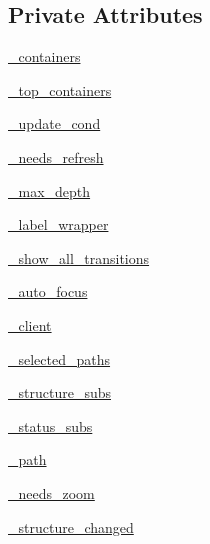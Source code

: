 \subsection*{Private Attributes}
\begin{DoxyCompactItemize}
\item 
\hyperlink{classsmacc__viewer_1_1SmaccViewerFrame_a00ea07c6cc068340230dcac273ad5e90}{\+\_\+containers}
\item 
\hyperlink{classsmacc__viewer_1_1SmaccViewerFrame_acc2f4310b3de2703026548d0d18387ea}{\+\_\+top\+\_\+containers}
\item 
\hyperlink{classsmacc__viewer_1_1SmaccViewerFrame_a87c1757aa21438ca8692b2f079b8f393}{\+\_\+update\+\_\+cond}
\item 
\hyperlink{classsmacc__viewer_1_1SmaccViewerFrame_a42ba63ae6741b2ced224cc0f8aa48bff}{\+\_\+needs\+\_\+refresh}
\item 
\hyperlink{classsmacc__viewer_1_1SmaccViewerFrame_acf8a98a2a2d4ae1f21e0fc3cd020b89a}{\+\_\+max\+\_\+depth}
\item 
\hyperlink{classsmacc__viewer_1_1SmaccViewerFrame_a839af1f1021fa7e47ccdfd63d2c56406}{\+\_\+label\+\_\+wrapper}
\item 
\hyperlink{classsmacc__viewer_1_1SmaccViewerFrame_adf4d6790cc3c124fd01509f6798eeb57}{\+\_\+show\+\_\+all\+\_\+transitions}
\item 
\hyperlink{classsmacc__viewer_1_1SmaccViewerFrame_a733f65cc99ce9d6effae5c6a87be4989}{\+\_\+auto\+\_\+focus}
\item 
\hyperlink{classsmacc__viewer_1_1SmaccViewerFrame_a64056f729cac85e212d484b48704ace9}{\+\_\+client}
\item 
\hyperlink{classsmacc__viewer_1_1SmaccViewerFrame_abf24da63695ba6bd9aae3dff6e3c5aa7}{\+\_\+selected\+\_\+paths}
\item 
\hyperlink{classsmacc__viewer_1_1SmaccViewerFrame_aed30d68f7aa8ba4a422da87216e4ef5a}{\+\_\+structure\+\_\+subs}
\item 
\hyperlink{classsmacc__viewer_1_1SmaccViewerFrame_aa5b8451546ae5f2048b30670dada3ac4}{\+\_\+status\+\_\+subs}
\item 
\hyperlink{classsmacc__viewer_1_1SmaccViewerFrame_a0e29b01e74edbb322f62e8ab6fdd359a}{\+\_\+path}
\item 
\hyperlink{classsmacc__viewer_1_1SmaccViewerFrame_a2307d88cbcee116cf8a6fa2201aedc44}{\+\_\+needs\+\_\+zoom}
\item 
\hyperlink{classsmacc__viewer_1_1SmaccViewerFrame_aa5d9c77b0c46dfb7d5258d1efbcc74b0}{\+\_\+structure\+\_\+changed}

\end{DoxyCompactItemize}
